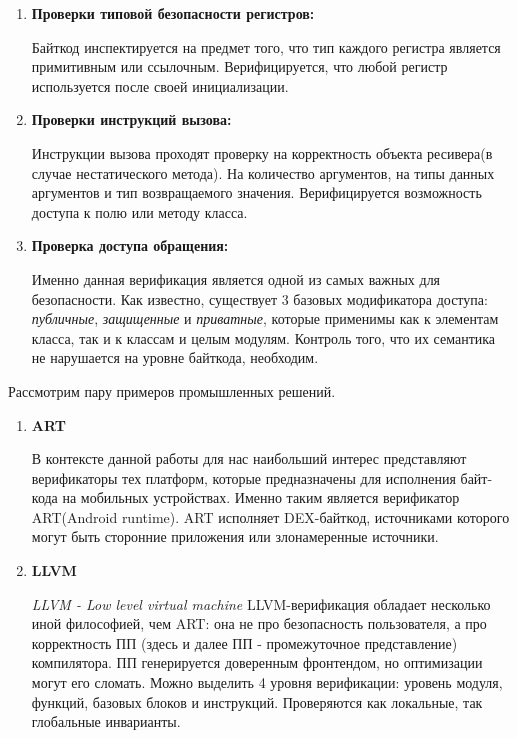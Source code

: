 \begin{enumerate}
    \item \textbf{Проверки типовой безопасности регистров:}
    
    Байткод инспектируется на предмет того, что тип каждого регистра является примитивным или 
    ссылочным. Верифицируется, что любой регистр используется после своей инициализации.

    \item \textbf{Проверки инструкций вызова:}
    
    Инструкции вызова проходят проверку на корректность объекта ресивера(в случае нестатического метода).
    На количество аргументов, на типы данных аргументов и тип возвращаемого значения. Верифицируется
    возможность доступа к полю или методу класса.

    \item \textbf{Проверка доступа обращения:}
    
    Именно данная верификация является одной из самых важных для безопасности. Как известно, 
    существует 3 базовых модификатора доступа: \textit{публичные}, \textit{защищенные} и \textit{приватные}, которые
    применимы как к элементам класса, так и к классам и целым модулям. Контроль того, что их семантика
    не нарушается на уровне байткода, необходим.
\end{enumerate}

Рассмотрим пару примеров промышленных решений.
\begin{enumerate}

    \item \textbf{ART}

    В контексте данной работы для нас наибольший интерес представляют верификаторы тех платформ, которые 
    предназначены для исполнения байт-кода на мобильных устройствах. Именно таким является верификатор ART(Android
    runtime). ART исполняет DEX-байткод, источниками которого могут быть сторонние приложения или злонамеренные источники. 
    \item \textbf{LLVM} 

    \textit{LLVM - Low level virtual machine}
    LLVM-верификация обладает несколько иной философией, чем ART: она не про безопасность 
    пользователя, а про корректность ПП (здесь и далее ПП - промежуточное представление) компилятора. ПП 
    генерируется доверенным фронтендом, но оптимизации могут его сломать. Можно выделить 4 уровня верификации:
    уровень модуля, функций, базовых блоков и инструкций. Проверяются как локальные, так глобальные инварианты.
\end{enumerate}
